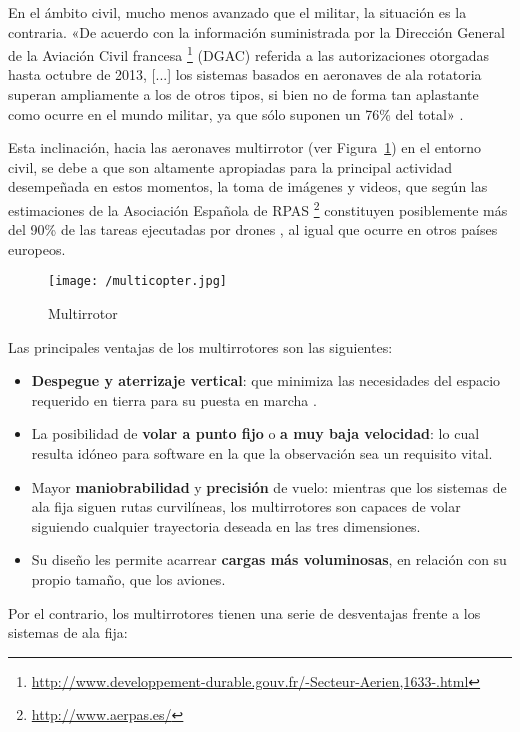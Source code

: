 En el ámbito civil, mucho menos avanzado que el militar, la situación es la contraria. «De acuerdo con la información suministrada por la Dirección General de la Aviación Civil francesa \footnote{\url{http://www.developpement-durable.gouv.fr/-Secteur-Aerien,1633-.html}} (DGAC) referida a las autorizaciones otorgadas hasta octubre de 2013, [...] los sistemas basados en aeronaves de ala rotatoria superan ampliamente
a los de otros tipos, si bien no de forma tan aplastante como ocurre en el mundo militar, ya que sólo suponen un 76\% del total» \cite{dron2}.

Esta inclinación, hacia las aeronaves multirrotor (ver Figura~\ref{fig:multirrotor}) en el entorno civil, se debe a que son altamente apropiadas para la principal actividad desempeñada en estos momentos, la toma de imágenes y videos, que según las estimaciones de la Asociación Española de RPAS \footnote{\url{http://www.aerpas.es/}} constituyen posiblemente más del 90\% de las tareas ejecutadas por drones \cite{AERPAS}, al igual que ocurre en otros países europeos.

\begin{figure}[!h]
\begin{center}
\texttt{[image: /multicopter.jpg]}
\caption[Sistema multirrotor]{Multirrotor}
\label{fig:multirrotor}
\end{center}
\end{figure}

Las principales ventajas de los multirrotores son las siguientes:

\begin{itemize}
\item \textbf{Despegue y aterrizaje vertical}: que minimiza las necesidades del espacio requerido en tierra para su puesta en marcha	.
\item La posibilidad de \textbf{volar a punto fijo} o \textbf{a muy baja velocidad}: lo cual resulta idóneo para software en la que la observación sea un requisito vital.
\item Mayor \textbf{maniobrabilidad} y \textbf{precisión} de vuelo: mientras que los sistemas de ala fija siguen rutas curvilíneas, los multirrotores son capaces de volar siguiendo cualquier trayectoria deseada en las tres dimensiones.
\item Su diseño les permite acarrear \textbf{cargas más voluminosas}, en relación con su propio tamaño, que los aviones.
\end{itemize}

Por el contrario, los multirrotores tienen una serie de desventajas frente a los sistemas de ala fija:

